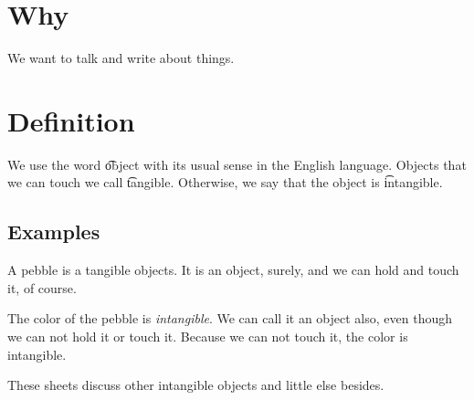 
\section*{Why}

We want to talk and write about things.

\section*{Definition}

We use the word \t{object} with its usual sense in the English language.
Objects that we can touch we call \t{tangible}.
Otherwise, we say that the object is \t{intangible}.

\subsection*{Examples}

A pebble is a tangible objects.
It is an object, surely, and we can hold and touch it, of course.

The color of the pebble is \textit{intangible}.
We can call it an object also, even though we can not hold it or touch it.
Because we can not touch it, the color is intangible.

These sheets discuss other intangible objects and little else besides.

\blankpage